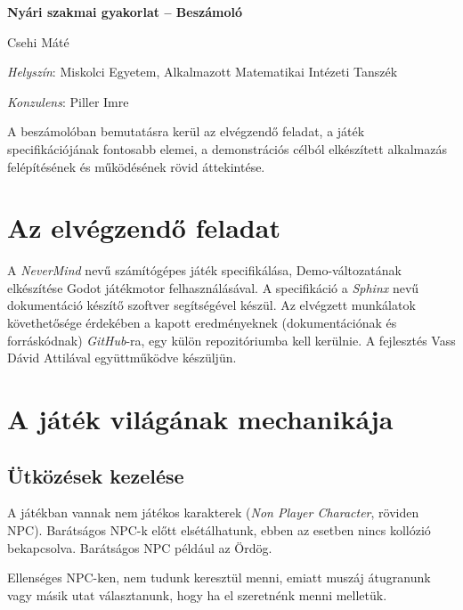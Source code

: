 \documentclass[a4paper]{article}
\begin{document}


\begin{center}
    \Large \textbf{Nyári szakmai gyakorlat -- Beszámoló}
    
	\bigskip
	
	\Large Csehi Máté
\end{center}

\medskip

\textit{Helyszín}: Miskolci Egyetem, Alkalmazott Matematikai Intézeti Tanszék

\textit{Konzulens}: Piller Imre

\bigskip

A beszámolóban bemutatásra kerül az elvégzendő feladat, a játék specifikációjának fontosabb elemei, a demonstrációs célból elkészített alkalmazás felépítésének és működésének rövid áttekintése.

\tableofcontents

\section{Az elvégzendő feladat}

A \textit{NeverMind} nevű számítógépes játék specifikálása, Demo-változatának elkészítése Godot játékmotor felhasználásával. A specifikáció a \textit{Sphinx} nevű dokumentáció készítő szoftver segítségével készül. Az elvégzett munkálatok követhetősége érdekében a kapott eredményeknek (dokumentációnak és forráskódnak) \textit{GitHub}-ra, egy külön repozitóriumba kell kerülnie. A fejlesztés Vass Dávid Attilával együttműködve készüljün.

\section{A játék világának mechanikája}

\subsection{Ütközések kezelése}

A játékban vannak nem játékos karakterek (\textit{Non Player Character}, röviden NPC).
Barátságos NPC-k előtt elsétálhatunk, ebben az esetben nincs kollózió bekapcsolva.
Barátságos NPC például az Ördög.

Ellenséges NPC-ken, nem tudunk keresztül menni,
emiatt muszáj átugranunk vagy másik utat választanunk, hogy ha el szeretnénk menni melletük.
\end{document}
